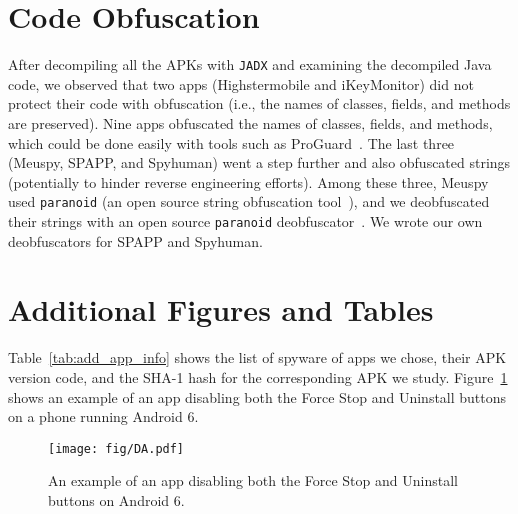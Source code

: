 \section{Code Obfuscation}
\label{sec:apk_obfuscation}

After decompiling all the APKs with \texttt{JADX} and examining the
decompiled Java code, we observed that two apps (Highstermobile and
iKeyMonitor) did not protect their code with obfuscation
(i.e., the names of classes, fields, and methods are preserved). Nine
apps obfuscated the names of classes, fields, and methods, which could
be done easily with tools such as ProGuard~\cite{LeaderIn1:online}.
The last three (Meuspy, SPAPP, and Spyhuman)
went a step further and also obfuscated strings (potentially to hinder
reverse engineering efforts). Among these three, Meuspy used
\texttt{paranoid} (an open source string obfuscation
tool~\cite{MichaelR90:online}), and we deobfuscated their strings with
an open source \texttt{paranoid}
deobfuscator~\cite{giacomof39:online}. We wrote our own deobfuscators
for SPAPP and Spyhuman.


\section{Additional Figures and Tables}
\label{sec:additional_figures}

Table~\ref{tab:add_app_info} shows the list of spyware of apps we chose, their APK version code, and the SHA-1 hash for the corresponding APK we study.
Figure~\ref{fig:da} shows an example of an app disabling both the Force Stop and Uninstall buttons on a phone running Android 6.

\vspace*{2in}
\hspace*{1in}

\begin{figure}[t]
\centering
\texttt{[image: fig/DA.pdf]}
\caption{An example of an app disabling both the
Force Stop and Uninstall buttons on Android 6.}
\label{fig:da}
\end{figure}
